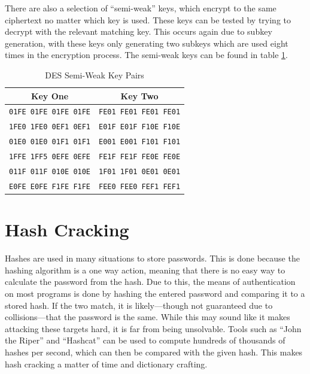 				There are also a selection of ``semi-weak'' keys, which encrypt to the same ciphertext no matter which key is used.
				These keys can be tested by trying to decrypt with the relevant matching key. 
				This occurs again due to subkey generation, with these keys only generating two subkeys which are used eight times in the encryption process. 
				The semi-weak keys can be found in table \ref{tab:DESSemiWeakKeys}.
				\begin{table}[htb]
					\centering
					\begin{tabular}{|c|c|}
						\hline
						\textbf{Key One} & \textbf{Key Two} \\ \hline
						\texttt{01FE 01FE 01FE 01FE} & \texttt{FE01 FE01 FE01 FE01} \\ \hline
						\texttt{1FE0 1FE0 0EF1 0EF1} & \texttt{E01F E01F F10E F10E} \\ \hline
						\texttt{01E0 01E0 01F1 01F1} & \texttt{E001 E001 F101 F101} \\ \hline
						\texttt{1FFE 1FF5 0EFE 0EFE} & \texttt{FE1F FE1F FE0E FE0E} \\ \hline
						\texttt{011F 011F 010E 010E} & \texttt{1F01 1F01 0E01 0E01} \\ \hline
						\texttt{E0FE E0FE F1FE F1FE} & \texttt{FEE0 FEE0 FEF1 FEF1} \\ \hline
					\end{tabular}
					\caption{DES Semi-Weak Key Pairs}
					\label{tab:DESSemiWeakKeys}
				\end{table}
				
	\section{Hash Cracking}
		Hashes are used in many situations to store passwords. 
		This is done because the hashing algorithm is a one way action, meaning that there is no easy way to calculate the password from the hash. 
		Due to this, the means of authentication on most programs is done by hashing the entered password and comparing it to a stored hash. 
		If the two match, it is likely---though not guaranteed due to collisions---that the password is the same. 
		While this may sound like it makes attacking these targets hard, it is far from being unsolvable. 
		Tools such as ``John the Riper'' and ``Hashcat'' can be used to compute hundreds of thousands of hashes per second, which can then be compared with the given hash. 
		This makes hash cracking a matter of time and dictionary crafting. 
